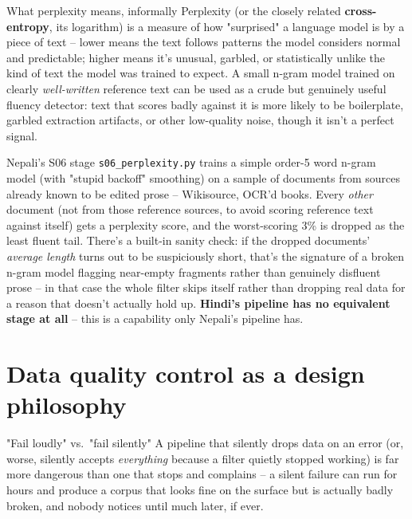 \documentclass[11pt]{report}
\begin{document}
\begin{concept}{What perplexity means, informally}
Perplexity (or the closely related \textbf{cross-entropy}, its
logarithm) is a measure of how "surprised" a language model is by a
piece of text -- lower means the text follows patterns the model
considers normal and predictable; higher means it's unusual, garbled, or
statistically unlike the kind of text the model was trained to expect. A
small n-gram model trained on clearly \textit{well-written} reference
text can be used as a crude but genuinely useful fluency detector: text
that scores badly against it is more likely to be boilerplate, garbled
extraction artifacts, or other low-quality noise, though it isn't a
perfect signal.
\end{concept}

\begin{implementation}{Nepali's S06 stage}
\texttt{s06\_perplexity.py} trains a simple order-5 word n-gram model
(with "stupid backoff" smoothing) on a sample of documents from sources
already known to be edited prose -- Wikisource, OCR'd books. Every
\textit{other} document (not from those reference sources, to avoid
scoring reference text against itself) gets a perplexity score, and the
worst-scoring 3\% is dropped as the least fluent tail. There's a
built-in sanity check: if the dropped documents' \textit{average length}
turns out to be suspiciously short, that's the signature of a broken
n-gram model flagging near-empty fragments rather than genuinely
disfluent prose -- in that case the whole filter skips itself rather
than dropping real data for a reason that doesn't actually hold up.
\textbf{Hindi's pipeline has no equivalent stage at all} -- this is a
capability only Nepali's pipeline has.
\end{implementation}

\section{Data quality control as a design philosophy}

\begin{concept}{"Fail loudly" vs.\ "fail silently"}
A pipeline that silently drops data on an error (or, worse, silently
accepts \textit{everything} because a filter quietly stopped working) is
far more dangerous than one that stops and complains -- a silent failure
can run for hours and produce a corpus that looks fine on the surface but
is actually badly broken, and nobody notices until much later, if ever.
\end{concept}
\end{document}
